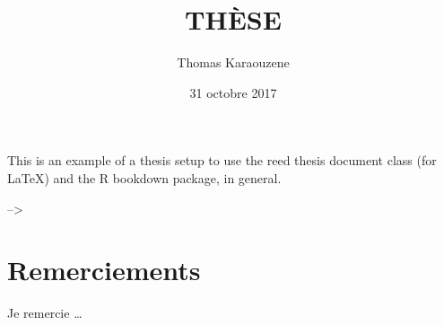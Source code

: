 \documentclass[12pt,twoside]{reedthesis}
\title{THÈSE}
\author{Thomas Karaouzene}
\date{31 octobre 2017}
\theoremstyle{definition}
\theoremstyle{definition}
\theoremstyle{remark}
\begin{document}
      \maketitle
  
  \frontmatter %
  \pagestyle{empty} %

  
      \begin{preface}
      This is an example of a thesis setup to use the reed thesis document
      class (for LaTeX) and the R bookdown package, in general.
    \end{preface}
  
      \hypersetup{linkcolor=black}
    \setcounter{tocdepth}{2}
    \tableofcontents
  
      \listoftables
  
      \listoffigures
  
  
  
  \mainmatter %
  \pagestyle{fancyplain} %

  --\textgreater{}
  
  \chapter*{Remerciements}\label{remerciements}
  
  Je remercie \ldots{}
  
  \newpage  
  
  ~
  
  ~
  
  ~
  
  ~
  
  ~
  
  ~
  
  ~
  
  ~
  
  ~
  
  ~
  
  ~
  
  ~
  
  ~
  
  ~
  
  ~
  
  ~
  
  ~
  
  ~
  
  ~
  
  ~
  
  ~
  
\end{document}
